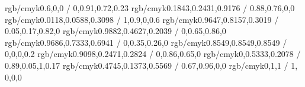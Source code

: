 \newcommand{\targetcolourmodel}{rgb} %
\selectcolormodel{\targetcolourmodel}

\definecolor{dtured}    {rgb/cmyk}{0.6,0,0 / 0,0.91,0.72,0.23}
\definecolor{blue}      {rgb/cmyk}{0.1843,0.2431,0.9176 / 0.88,0.76,0,0}
\definecolor{navyblue}  {rgb/cmyk}{0.0118,0.0588,0.3098 / 1,0.9,0,0.6}
\definecolor{yellow}    {rgb/cmyk}{0.9647,0.8157,0.3019 / 0.05,0.17,0.82,0}
\definecolor{orange}    {rgb/cmyk}{0.9882,0.4627,0.2039 / 0,0.65,0.86,0}
\definecolor{pink}      {rgb/cmyk}{0.9686,0.7333,0.6941 / 0,0.35,0.26,0}
\definecolor{grey}      {rgb/cmyk}{0.8549,0.8549,0.8549 / 0,0,0,0.2}
\definecolor{red}       {rgb/cmyk}{0.9098,0.2471,0.2824 / 0,0.86,0.65,0}
\definecolor{green}     {rgb/cmyk}{0,0.5333,0.2078 / 0.89,0.05,1,0.17}
\definecolor{purple}    {rgb/cmyk}{0.4745,0.1373,0.5569 / 0.67,0.96,0,0}
\definecolor{cyan}    {rgb/cmyk}{0,1,1 / 1, 0,0,0}

\newcommand{\dtulogocolour}{white} %
\newcommand{\frontpagetextcolour}{white} %



